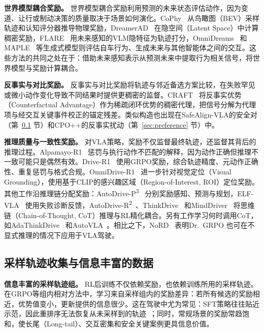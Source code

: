 \documentclass[runningheads]{llncs}
\begin{document}
\textbf{世界模型耦合奖励。}
世界模型耦合奖励利用预测的未来状态评估动作，因为变道、让行或制动决策的质量取决于场景如何演化。CoPhy~\cite{cophy2026} 从鸟瞰图（BEV）采样轨迹和认知评分器推导物理奖励，DreamerAD~\cite{dreamerad2026} 在隐空间（Latent Space）中计算稠密奖励，FLARE~\cite{flare2026} 用未来感知的VLM隐特征为轨迹打分，OmniDreams~\cite{omnidreams2026} 和MAPLE~\cite{maple2026} 等生成式模型则评估自车行为、生成未来与其他智能体之间的交互。这些方法的共同之处在于：借助未来感知表示从预测未来中提取行为相关信号，将世界模型与奖励计算耦合。


\textbf{反事实与对比奖励。}
反事实与对比奖励将轨迹与邻近备选方案比较，在失败罕见或微小动作变化导致不同结果时提供更稠密的监督。CRAFT~\cite{craft2026} 将反事实优势（Counterfactual Advantage）作为稀疏闭环优势的稠密代理，把信号分解为代理项与经交互关键事件校正的锚定残差。类似构造也出现在SafeAlign-VLA的安全对（第~\ref{sec:exploration} 节）和CPO++的反事实扰动（第~\ref{sec:preference} 节）中。

\textbf{推理质量与一致性奖励。}
对VLA策略，奖励不仅监督最终轨迹，还监督其背后的推理过程。Alpamayo-R1~\cite{alpamayo2025} 惩罚与执行动作不匹配的解释，因为动作正确但推理不一致可能只是偶然有效。Drive-R1~\cite{li2026drive} 使用GRPO奖励，综合轨迹精度、元动作正确性、重复惩罚与格式合规。OmniDrive-R1~\cite{zhang2026omnidrive} 进一步针对视觉定位（Visual Grounding），使用基于CLIP的感兴趣区域（Region-of-Interest, ROI）定位奖励。其他工作沿推理链分配奖励：AutoDrive-P\textsuperscript{3}~\cite{autodrivep3_2026} 分别奖励感知、预测与规划，ELF-VLA~\cite{elfvla2026} 使用失败诊断反馈，AutoDrive-R\textsuperscript{2}~\cite{autodriver2_2025}、ThinkDrive~\cite{thinkdrive2026} 和MindDriver~\cite{minddriver2026} 将思维链（Chain-of-Thought, CoT）推理与RL精化耦合。另有工作学习何时调用CoT，如AdaThinkDrive~\cite{adathinkdrive2025} 和AutoVLA~\cite{autovla2025}。相比之下，NoRD~\cite{nord2026} 表明Dr.~GRPO 也可在不显式推理的情况下应用于VLA驾驶。




\subsection{采样轨迹收集与信息丰富的数据}
\label{sec:exploration}

\textbf{信息丰富的采样轨迹组。}
RL后训练不仅依赖奖励，也依赖训练所用的采样轨迹。在GRPO等组内相对方法中，学习来自采样组内的奖励差异：若所有候选的奖励相近，优势值变小，更新提供的信息很少。这在驾驶中尤为常见：SFT策略往往贴近示范，因此重排序无法恢复从未采样到的轨迹~\cite{dial2026}；同时，常规场景的奖励常趋饱和，使长尾（Long-tail）、交互密集和安全关键案例更具信息价值。
\end{document}
